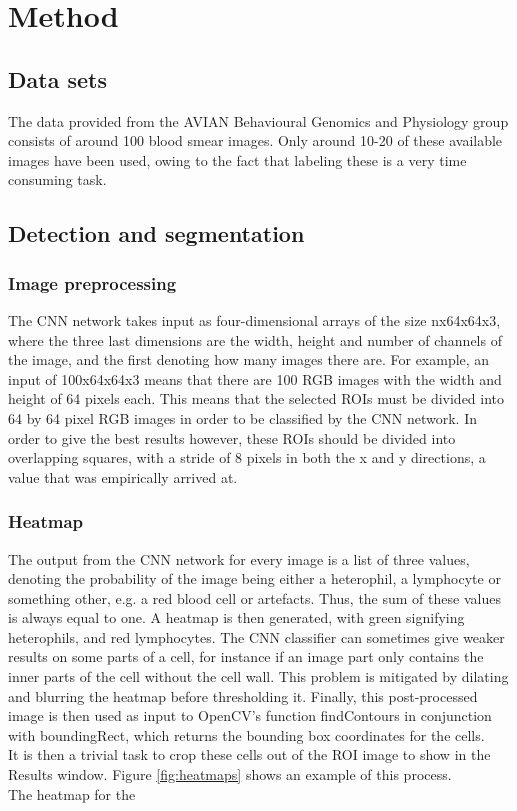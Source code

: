 \chapter{Method}\label{cha:intro}

\section{Data sets}
The data provided from the AVIAN Behavioural Genomics and Physiology group consists of around 100 blood smear images. Only around 10-20 of these available images have been used, owing to the fact that labeling these is a very time consuming task. 

\section{Detection and segmentation}

\subsection{Image preprocessing}
The CNN network takes input as four-dimensional arrays of the size nx64x64x3, where the three last dimensions are the width, height and number of channels of the image, and the first denoting how many images there are. For example, an input of 100x64x64x3 means that there are 100 RGB images with the width and height of 64 pixels each. This means that the selected ROIs must be divided into 64 by 64 pixel RGB images in order to be classified by the CNN network. In order to give the best results however, these ROIs should be divided into overlapping squares, with a stride of 8 pixels in both the x and y directions, a value that was empirically arrived at. 

\subsection{Heatmap}
The output from the CNN network for every image is a list of three values, denoting the probability of the image being either a heterophil, a lymphocyte or something other, e.g. a red blood cell or artefacts. Thus, the sum of these values is always equal to one. A heatmap is then generated, with green signifying heterophils, and red lymphocytes. The CNN classifier can sometimes give weaker results on some parts of a cell, for instance if an image part only contains the inner parts of the cell without the cell wall. This problem is mitigated by dilating and blurring the heatmap before thresholding it. Finally, this post-processed image is then used as input to OpenCV's function findContours in conjunction with boundingRect, which returns the bounding box coordinates for the cells.\\
It is then a trivial task to crop these cells out of the ROI image to show in the Results window. Figure \ref{fig:heatmaps} shows an example of this process.\\
The heatmap for the 

